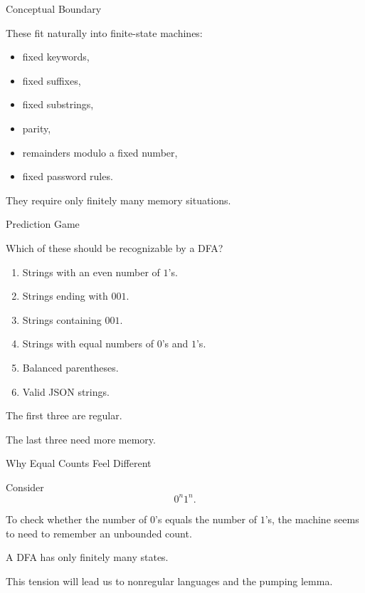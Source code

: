 \documentclass[10pt,aspectratio=169]{beamer}
\begin{document}
\begin{frame}{Conceptual Boundary}

These fit naturally into finite-state machines:

\begin{itemize}
\item fixed keywords,
\item fixed suffixes,
\item fixed substrings,
\item parity,
\item remainders modulo a fixed number,
\item fixed password rules.
\end{itemize}

\pause

They require only finitely many memory situations.

\end{frame}

\begin{frame}{Prediction Game}

Which of these should be recognizable by a DFA?

\begin{enumerate}
\item Strings with an even number of $1$'s.
\item Strings ending with $001$.
\item Strings containing $001$.
\item Strings with equal numbers of $0$'s and $1$'s.
\item Balanced parentheses.
\item Valid JSON strings.
\end{enumerate}

\pause

The first three are regular.

The last three need more memory.

\end{frame}

\begin{frame}{Why Equal Counts Feel Different}

Consider
\[
0^n1^n.
\]

To check whether the number of $0$'s equals the number of $1$'s, the machine seems to need to remember an unbounded count.

\pause

A DFA has only finitely many states.

\pause

This tension will lead us to nonregular languages and the pumping lemma.

\end{frame}
\end{document}
